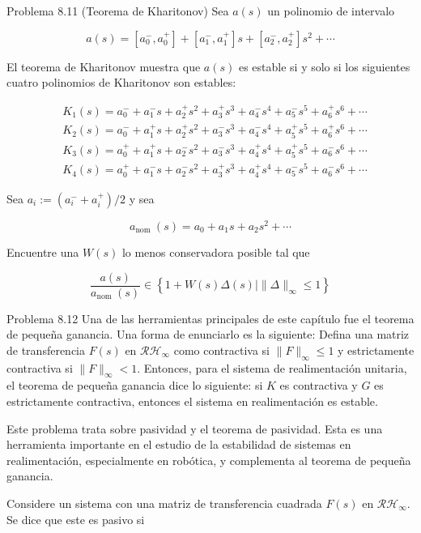 Problema 8.11 (Teorema de Kharitonov) Sea $a(s)$ un polinomio de intervalo

$$
a(s)=\left[a_{0}^{-}, a_{0}^{+}\right]+\left[a_{1}^{-}, a_{1}^{+}\right] s+\left[a_{2}^{-}, a_{2}^{+}\right] s^{2}+\cdots
$$

El teorema de Kharitonov muestra que $a(s)$ es estable si y solo si los siguientes cuatro polinomios de Kharitonov son estables:

$$
\begin{aligned}
& K_{1}(s)=a_{0}^{-}+a_{1}^{-} s+a_{2}^{+} s^{2}+a_{3}^{+} s^{3}+a_{4}^{-} s^{4}+a_{5}^{-} s^{5}+a_{6}^{+} s^{6}+\cdots \\
& K_{2}(s)=a_{0}^{-}+a_{1}^{+} s+a_{2}^{+} s^{2}+a_{3}^{-} s^{3}+a_{4}^{-} s^{4}+a_{5}^{+} s^{5}+a_{6}^{+} s^{6}+\cdots \\
& K_{3}(s)=a_{0}^{+}+a_{1}^{+} s+a_{2}^{-} s^{2}+a_{3}^{-} s^{3}+a_{4}^{+} s^{4}+a_{5}^{+} s^{5}+a_{6}^{-} s^{6}+\cdots \\
& K_{4}(s)=a_{0}^{+}+a_{1}^{-} s+a_{2}^{-} s^{2}+a_{3}^{+} s^{3}+a_{4}^{+} s^{4}+a_{5}^{-} s^{5}+a_{6}^{-} s^{6}+\cdots
\end{aligned}
$$

Sea $a_{i}:=\left(a_{i}^{-}+a_{i}^{+}\right) / 2$ y sea

$$
a_{\text {nom }}(s)=a_{0}+a_{1} s+a_{2} s^{2}+\cdots
$$

Encuentre una $W(s)$ lo menos conservadora posible tal que

$$
\frac{a(s)}{a_{\text {nom }}(s)} \in\left\{1+W(s) \Delta(s) \mid\|\Delta\|_{\infty} \leq 1\right\}
$$

Problema 8.12 Una de las herramientas principales de este capítulo fue el teorema de pequeña ganancia. Una forma de enunciarlo es la siguiente: Defina una matriz de transferencia $F(s)$ en $\mathcal{R} \mathcal{H}_{\infty}$ como contractiva si $\|F\|_{\infty} \leq 1$ y estrictamente contractiva si $\|F\|_{\infty}<1$. Entonces, para el sistema de realimentación unitaria, el teorema de pequeña ganancia dice lo siguiente: si $K$ es contractiva y $G$ es estrictamente contractiva, entonces el sistema en realimentación es estable.

Este problema trata sobre pasividad y el teorema de pasividad. Esta es una herramienta importante en el estudio de la estabilidad de sistemas en realimentación, especialmente en robótica, y complementa al teorema de pequeña ganancia.

Considere un sistema con una matriz de transferencia cuadrada $F(s)$ en $\mathcal{R} \mathcal{H}_{\infty}$. Se dice que este es pasivo si

